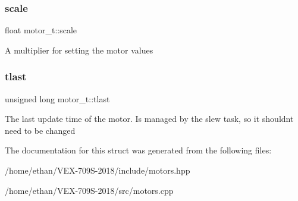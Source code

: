 \subsubsection{\texorpdfstring{scale}{scale}}
{\footnotesize\ttfamily float motor\+\_\+t\+::scale}

A multiplier for setting the motor values \mbox{\label{structmotor__t_a4f00b961c42d53610d71bb90efdcd089}} 
\subsubsection{\texorpdfstring{tlast}{tlast}}
{\footnotesize\ttfamily unsigned long motor\+\_\+t\+::tlast}

The last update time of the motor. Is managed by the slew task, so it shouldn\textquotesingle{}t need to be changed 

The documentation for this struct was generated from the following files\+:\begin{DoxyCompactItemize}
\item 
/home/ethan/\+V\+E\+X-\/709\+S-\/2018/include/motors.\+hpp\item 
/home/ethan/\+V\+E\+X-\/709\+S-\/2018/src/motors.\+cpp\end{DoxyCompactItemize}
